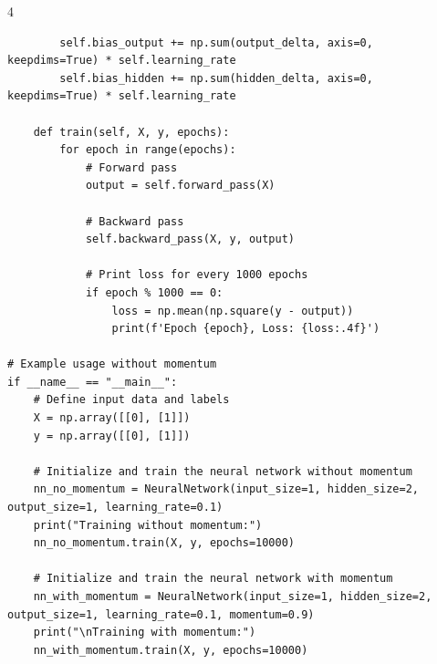\documentclass[12pt]{article}
\begin{document}
\begin{multicols*}{4}
\begin{lstlisting}
        self.bias_output += np.sum(output_delta, axis=0, keepdims=True) * self.learning_rate
        self.bias_hidden += np.sum(hidden_delta, axis=0, keepdims=True) * self.learning_rate

    def train(self, X, y, epochs):
        for epoch in range(epochs):
            # Forward pass
            output = self.forward_pass(X)

            # Backward pass
            self.backward_pass(X, y, output)

            # Print loss for every 1000 epochs
            if epoch % 1000 == 0:
                loss = np.mean(np.square(y - output))
                print(f'Epoch {epoch}, Loss: {loss:.4f}')

# Example usage without momentum
if __name__ == "__main__":
    # Define input data and labels
    X = np.array([[0], [1]])
    y = np.array([[0], [1]])

    # Initialize and train the neural network without momentum
    nn_no_momentum = NeuralNetwork(input_size=1, hidden_size=2, output_size=1, learning_rate=0.1)
    print("Training without momentum:")
    nn_no_momentum.train(X, y, epochs=10000)

    # Initialize and train the neural network with momentum
    nn_with_momentum = NeuralNetwork(input_size=1, hidden_size=2, output_size=1, learning_rate=0.1, momentum=0.9)
    print("\nTraining with momentum:")
    nn_with_momentum.train(X, y, epochs=10000)
\end{lstlisting}


\end{multicols*}
\end{document}
